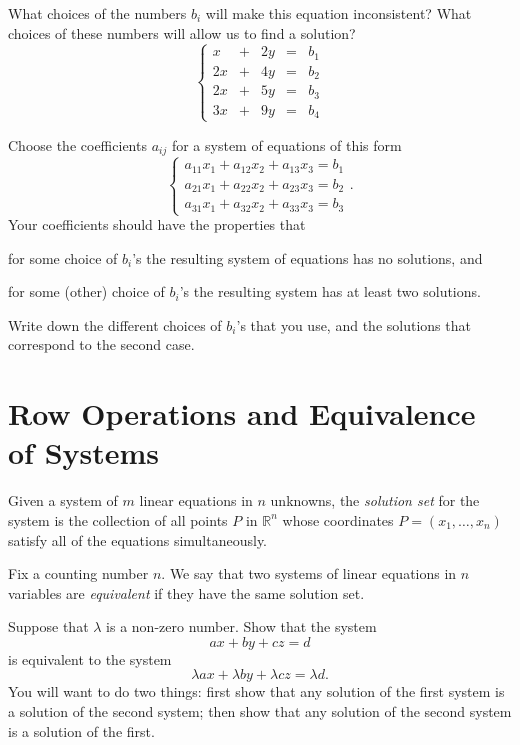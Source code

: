 \documentclass[cahier-main.tex]{subfiles}
\begin{document}
\begin{task}
What choices of the numbers $b_i$ will make this equation inconsistent? What choices of these numbers will allow us to find a solution?
\[
\left\{
\begin{array}{rrrrr}
x & + & 2y & = & b_1 \\
2x & + & 4y & = & b_2 \\
2x & + & 5y & = & b_3 \\
3x & + & 9y & = & b_4 
\end{array}\right.
\]
\end{task}

\begin{challenge}
Choose the coefficients $a_{ij}$ for a system of equations of this form
\[
\left\{
\begin{array}{rrrrrrr}
a_{11}x_1 + a_{12}x_2 + a_{13}x_3 = b_1 \\
a_{21}x_1 + a_{22}x_2 + a_{23}x_3 = b_2 \\
a_{31}x_1 + a_{32}x_2 + a_{33}x_3 = b_3 
\end{array}
\right. .
\]
Your coefficients should have the properties that 
\begin{compactenum}
\item for some choice of $b_i$'s the resulting system of equations has no solutions, and
\item for some (other) choice of $b_i$'s the resulting system has at least two solutions.
\end{compactenum}
Write down the different choices of $b_i$'s that you use, and the solutions that correspond to the second case.
\end{challenge}

\section{Row Operations and Equivalence of Systems}

\begin{definition} Given a system of $m$ linear equations in $n$ unknowns, the \emph{solution set} for the system is the collection of all points $P$ in $\mathbb{R}^n$ whose coordinates $P =(x_1, \ldots, x_n)$ satisfy all of the equations simultaneously.


Fix a counting number $n$.
We say that two systems of linear equations in $n$ variables are \emph{equivalent} if
they have the same solution set.
\end{definition}

\begin{task}
Suppose that $\lambda$ is a non-zero number. Show that 
the system
\[
ax + by +cz = d
\]
is equivalent to the system
\[
\lambda ax + \lambda by  + \lambda cz = \lambda d .
\]
You will want to do two things: first show that any solution of the first system is a solution of the second system; then show that any solution of the second system is a solution of the first.
\end{task}
\end{document}
